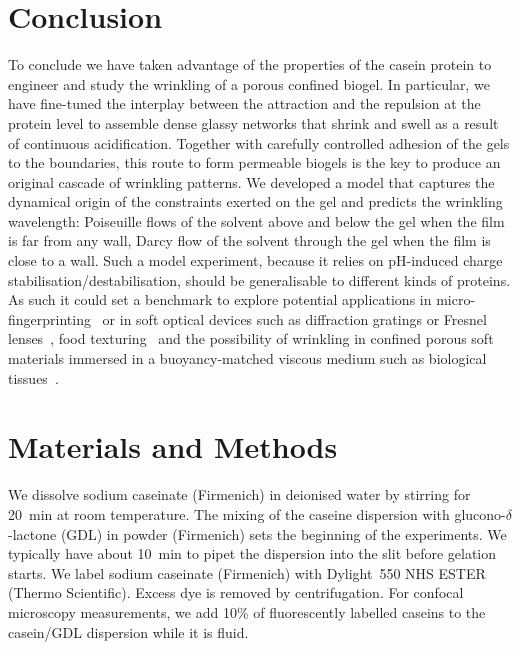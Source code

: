 \documentclass[twocolumn,superscriptaddress,showpacs,preprintnumbers, amsmath,amssymb,prl]{revtex4-1}
\begin{document}
\section*{Conclusion}

To conclude we have taken advantage of the properties of the casein protein to engineer and study the wrinkling of a porous confined biogel. In particular, we have fine-tuned the interplay between the attraction and the repulsion at the protein level to assemble dense glassy networks that shrink and swell as a result of continuous acidification. Together with carefully controlled adhesion of the gels to the boundaries, this route to form permeable biogels is the key to produce an original cascade of wrinkling patterns. We developed a model that captures the dynamical origin of the constraints exerted on the gel and predicts the wrinkling wavelength: Poiseuille flows of the solvent above and below the gel when the film is far from any wall, Darcy flow of the solvent through the gel when the film is close to a wall. Such a model experiment, because it relies on pH-induced charge stabilisation/destabilisation, should be generalisable to different kinds of proteins. As such it could set a benchmark to explore potential applications in micro-fingerprinting~\cite{Bae2015} or in soft optical devices such as diffraction gratings or Fresnel lenses~\cite{Li2013}, food texturing~\cite{Mezzenga2005,Gibaud2012a} and the possibility of wrinkling in confined porous soft materials immersed in a buoyancy-matched viscous medium such as biological tissues~\cite{Ma2004,Longley2013,Fleury2015}.



\section*{Materials and Methods}

We dissolve sodium caseinate (Firmenich) in deionised water by stirring for \SI{20}{\minute} at room temperature. The mixing of the caseine dispersion with glucono-$\delta$-lactone (GDL) in powder (Firmenich) sets the beginning of the experiments. We typically have about \SI{10}{\minute} to pipet the dispersion into the slit before gelation starts. We label sodium caseinate (Firmenich) with Dylight~550 NHS ESTER (Thermo Scientific). Excess dye is removed by centrifugation. For confocal microscopy measurements, we add 10\% of fluorescently labelled caseins to the casein/GDL dispersion while it is fluid.
\end{document}
